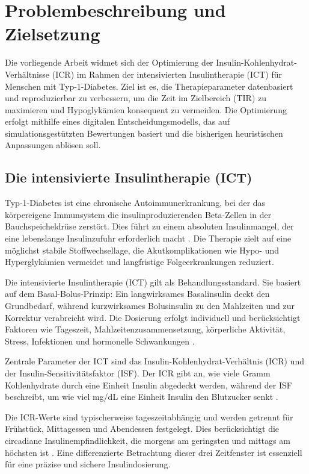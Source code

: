\section{Problembeschreibung und Zielsetzung}

Die vorliegende Arbeit widmet sich der Optimierung der Insulin-Kohlenhydrat-Verhältnisse (ICR) im Rahmen der intensivierten Insulintherapie (ICT) für Menschen mit Typ-1-Diabetes. Ziel ist es, die Therapieparameter datenbasiert und reproduzierbar zu verbessern, um die Zeit im Zielbereich (TIR) zu maximieren und Hypoglykämien konsequent zu vermeiden. Die Optimierung erfolgt mithilfe eines digitalen Entscheidungsmodells, das auf simulationsgestützten Bewertungen basiert und die bisherigen heuristischen Anpassungen ablösen soll.

\subsection{Die intensivierte Insulintherapie (ICT)}

Typ-1-Diabetes ist eine chronische Autoimmunerkrankung, bei der das körpereigene Immunsystem die insulinproduzierenden Beta-Zellen in der Bauchspeicheldrüse zerstört. Dies führt zu einem absoluten Insulinmangel, der eine lebenslange Insulinzufuhr erforderlich macht \cite{ddg2023}. Die Therapie zielt auf eine möglichst stabile Stoffwechsellage, die Akutkomplikationen wie Hypo- und Hyperglykämien vermeidet und langfristige Folgeerkrankungen reduziert.

Die intensivierte Insulintherapie (ICT) gilt als Behandlungsstandard. \cite{cengiz2022ispad} Sie basiert auf dem Basal-Bolus-Prinzip: Ein langwirksames Basalinsulin deckt den Grundbedarf, während kurzwirksames Bolusinsulin zu den Mahlzeiten und zur Korrektur verabreicht wird. Die Dosierung erfolgt individuell und berücksichtigt Faktoren wie Tageszeit, Mahlzeitenzusammensetzung, körperliche Aktivität, Stress, Infektionen und hormonelle Schwankungen \cite{ddg2023}.

Zentrale Parameter der ICT sind das Insulin-Kohlenhydrat-Verhältnis (ICR) und der Insulin-Sensitivitätsfaktor (ISF). Der ICR gibt an, wie viele Gramm Kohlenhydrate durch eine Einheit Insulin abgedeckt werden, während der ISF beschreibt, um wie viel mg/dL eine Einheit Insulin den Blutzucker senkt \cite{davidson2008analysis}.

Die ICR-Werte sind typischerweise tageszeitabhängig und werden getrennt für Frühstück, Mittagessen und Abendessen festgelegt. Dies berücksichtigt die circadiane Insulinempfindlichkeit, die morgens am geringsten und mittags am höchsten ist \cite{ddg2023}. Eine differenzierte Betrachtung dieser drei Zeitfenster ist essenziell für eine präzise und sichere Insulindosierung.

